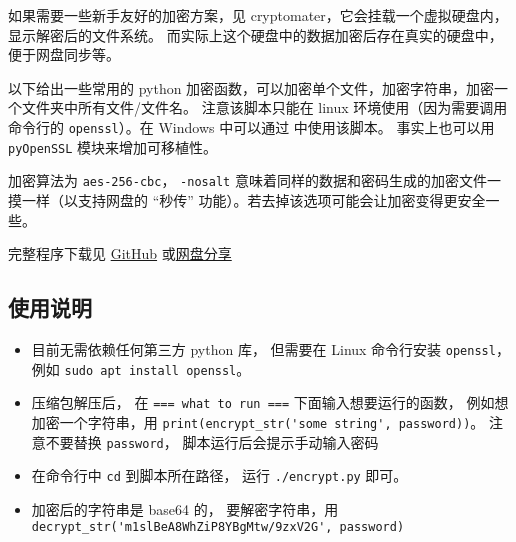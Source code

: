 

如果需要一些新手友好的加密方案，见 cryptomater，它会挂载一个虚拟硬盘内，显示解密后的文件系统。 而实际上这个硬盘中的数据加密后存在真实的硬盘中，便于网盘同步等。

以下给出一些常用的 python 加密函数，可以加密单个文件，加密字符串，加密一个文件夹中所有文件/文件名。 注意该脚本只能在 linux 环境使用（因为需要调用命令行的 \verb`openssl`）。在 Windows 中可以通过  中使用该脚本。 事实上也可以用 \verb|pyOpenSSL| 模块来增加可移植性。

加密算法为 \verb`aes-256-cbc`， \verb`-nosalt` 意味着同样的数据和密码生成的加密文件一摸一样（以支持网盘的 “秒传” 功能）。若去掉该选项可能会让加密变得更安全一些。

完整程序下载见 \href{https://github.com/MacroUniverse/MyPythonLibrary/tree/master/encrypt}{GitHub} 或\href{https://pan.baidu.com/s/1y4Asx-oS4ShGlN9kIyRZeg?pwd=3q1d#list/path=\%252F}{网盘分享}

\subsection{使用说明}
\begin{itemize}
\item 目前无需依赖任何第三方 python 库， 但需要在 Linux 命令行安装 \verb`openssl`， 例如 \verb`sudo apt install openssl`。
\item 压缩包解压后， 在 \verb`=== what to run ===` 下面输入想要运行的函数， 例如想加密一个字符串，用 \verb`print(encrypt_str('some string', password))`。 注意不要替换 \verb`password`， 脚本运行后会提示手动输入密码
\item 在命令行中 \verb`cd` 到脚本所在路径， 运行 \verb`./encrypt.py` 即可。
\item 加密后的字符串是 base64 的， 要解密字符串，用 \verb`decrypt_str('m1slBeA8WhZiP8YBgMtw/9zxV2G', password)`
\end{itemize}

